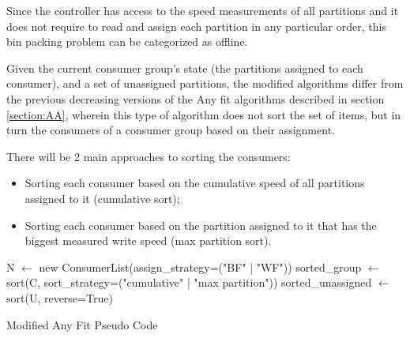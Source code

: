 Since the controller has access to the speed measurements of all partitions and
it does not require to read and assign each partition in any particular order,
this bin packing problem can be categorized as offline.

Given the current consumer group's state (the partitions assigned to each
consumer), and a set of unassigned partitions, the modified algorithms differ
from the previous decreasing versions of the Any fit algorithms described in
section \ref{section:AA}, wherein this type of algorithm does not sort the set
of items, but in turn the consumers of a consumer group based on their
assignment. 

There will be 2 main approaches to sorting the consumers: 
\begin{itemize} 
    \item Sorting each consumer based on the cumulative speed of all partitions
        assigned to it (cumulative sort); 
    \item Sorting each consumer based on the partition assigned to it that has
        the biggest measured write speed (max partition sort).  
\end{itemize}


\IncMargin{1em} 
\begin{algorithm}[htb!]
    \BlankLine 
    N $\leftarrow$ new ConsumerList(assign\_strategy=("BF" | "WF"))\; 
    sorted\_group $\leftarrow$ sort(C, sort\_strategy=("cumulative" | "max partition"))\; 
    sorted\_unassigned $\leftarrow$ sort(U, reverse=True)\; 
\caption{Modified Any Fit Pseudo Code}
\label{algo:MBPP} 
\end{algorithm}
\DecMargin{1em}

